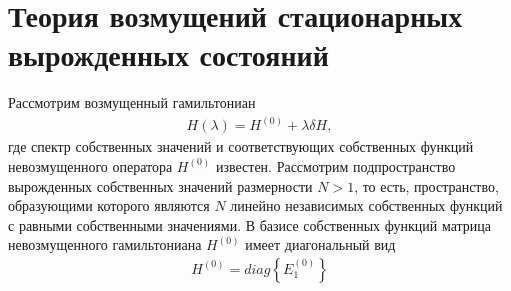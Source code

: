 \documentclass[12pt]{article}
\newcommand{\HO}{H^{(0)}}
\newcommand{\lc}{\left\{}
\newcommand{\rc}{\right\}}
\begin{document}
\section{Теория возмущений стационарных вырожденных состояний}

Рассмотрим возмущенный гамильтониан
\begin{gather}
    H(\lambda) = \HO + \lambda \delta H,
\end{gather}
где спектр собственных значений и соответствующих собственных функций невозмущенного оператора $\HO$ известен. Рассмотрим подпространство вырожденных собственных значений размерности $N > 1$, то есть, пространство, образующими которого являются $N$ линейно независимых собственных функций с равными собственными значениями. В базисе собственных функций матрица невозмущенного гамильтониана $\HO$ имеет диагональный вид
\begin{gather}
    \HO = diag \lc E_1^{(0)} \rc
\end{gather}
\end{document}
